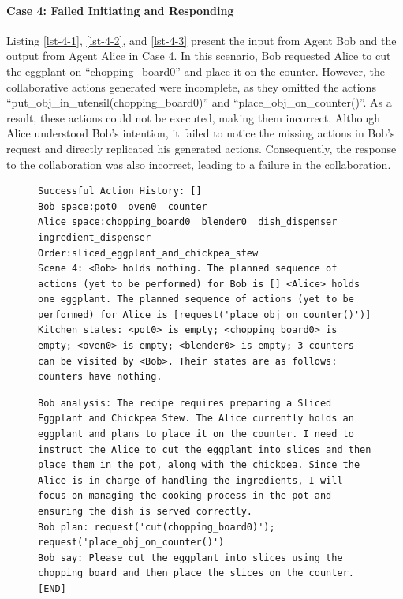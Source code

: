 \documentclass[11pt]{article}
\begin{document}
\paragraph{Case 4: Failed Initiating and Responding}

Listing \ref{lst-4-1}, \ref{lst-4-2}, and \ref{lst-4-3} present the input from Agent Bob and the output from Agent Alice in Case 4. In this scenario, Bob requested Alice to cut the eggplant on ``chopping\_board0'' and place it on the counter. However, the collaborative actions generated were incomplete, as they omitted the actions ``put\_obj\_in\_utensil(chopping\_board0)'' and ``place\_obj\_on\_counter()''. As a result, these actions could not be executed, making them incorrect. Although Alice understood Bob's intention, it failed to notice the missing actions in Bob's request and directly replicated his generated actions. Consequently, the response to the collaboration was also incorrect, leading to a failure in the collaboration.

\begin{figure}[H]
\begin{lstlisting}[caption={Case 4 Agent Bob's input},label={lst-4-1}]
Successful Action History: []
Bob space:pot0  oven0  counter 
Alice space:chopping_board0  blender0  dish_dispenser  ingredient_dispenser
Order:sliced_eggplant_and_chickpea_stew
Scene 4: <Bob> holds nothing. The planned sequence of actions (yet to be performed) for Bob is [] <Alice> holds one eggplant. The planned sequence of actions (yet to be performed) for Alice is [request('place_obj_on_counter()')] Kitchen states: <pot0> is empty; <chopping_board0> is empty; <oven0> is empty; <blender0> is empty; 3 counters can be visited by <Bob>. Their states are as follows: counters have nothing.
\end{lstlisting}
\end{figure}

\begin{figure}[H]
\begin{lstlisting}[caption={Case 4 Agent Bob's output},label={lst-4-2}]
Bob analysis: The recipe requires preparing a Sliced Eggplant and Chickpea Stew. The Alice currently holds an eggplant and plans to place it on the counter. I need to instruct the Alice to cut the eggplant into slices and then place them in the pot, along with the chickpea. Since the Alice is in charge of handling the ingredients, I will focus on managing the cooking process in the pot and ensuring the dish is served correctly.
Bob plan: request('cut(chopping_board0)'); request('place_obj_on_counter()')
Bob say: Please cut the eggplant into slices using the chopping board and then place the slices on the counter. [END]
\end{lstlisting}
\end{figure}
\end{document}
